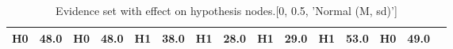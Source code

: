 \begin{table}
\begin{tabular}{c|cc|cc|cc|cc|cc|cc|cc}
\cellcolor{Bittersweet}H0&\cellcolor{Bittersweet}48.0&\cellcolor{Bittersweet}H0&\cellcolor{Bittersweet}48.0&\cellcolor{Bittersweet}H1&\cellcolor{Bittersweet}38.0&\cellcolor{Bittersweet}H1&\cellcolor{Bittersweet}28.0&\cellcolor{Bittersweet}H1&\cellcolor{Bittersweet}29.0&\cellcolor{Bittersweet}H1&\cellcolor{Bittersweet}53.0&\cellcolor{Bittersweet}H0&\cellcolor{Bittersweet}49.0\\\bottomrule\end{tabular}\caption{Evidence set with effect on hypothesis nodes.[0, 0.5, 'Normal (M, sd)']}\end{table}